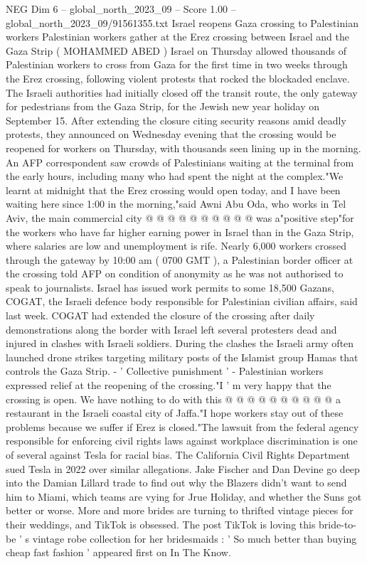 \begin{textsample}{NEG Dim 6 – global\_north\_2023\_09 – Score 1.00 – global\_north\_2023\_09/91561355.txt}  \label{ex:f6_neg_340}
Israel reopens Gaza crossing to Palestinian workers Palestinian workers gather at the Erez crossing between Israel and the Gaza Strip ( MOHAMMED ABED ) Israel on Thursday allowed thousands of Palestinian workers to cross from Gaza for the first time in two weeks through the Erez crossing, following violent protests that rocked the blockaded enclave.
The Israeli authorities had initially closed off the transit route, the only gateway for pedestrians from the Gaza Strip, for the Jewish new year holiday on September 15.
After extending the closure citing security reasons amid deadly protests, they announced on Wednesday evening that the crossing would be reopened for workers on Thursday, with thousands seen lining up in the morning.
An AFP correspondent saw crowds of Palestinians waiting at the terminal from the early hours, including many who had spent the night at the complex."We learnt at midnight that the Erez crossing would open today, and I have been waiting here since 1:00 in the morning,"said Awni Abu Oda, who works in Tel Aviv, the main commercial city @ @ @ @ @ @ @ @ @ @ was a"positive step"for the workers who have far higher earning power in Israel than in the Gaza Strip, where salaries are low and unemployment is rife.
Nearly 6,000 workers crossed through the gateway by 10:00 am ( 0700 GMT ), a Palestinian border officer at the crossing told AFP on condition of anonymity as he was not authorised to speak to journalists.
Israel has issued work permits to some 18,500 Gazans, COGAT, the Israeli defence body responsible for Palestinian civilian affairs, said last week.
COGAT had extended the closure of the crossing after daily demonstrations along the border with Israel left several protesters dead and injured in clashes with Israeli soldiers.
During the clashes the Israeli army often launched drone strikes targeting military posts of the Islamist group Hamas that controls the Gaza Strip. - ' Collective punishment ' - Palestinian workers expressed relief at the reopening of the crossing."I ' m very happy that the crossing is open.
We have nothing to do with this @ @ @ @ @ @ @ @ @ @ a restaurant in the Israeli coastal city of Jaffa."I hope workers stay out of these problems because we suffer if Erez is closed."The lawsuit from the federal agency responsible for enforcing civil rights laws against workplace discrimination is one of several against Tesla for racial bias.
The California Civil Rights Department sued Tesla in 2022 over similar allegations.
Jake Fischer and Dan Devine go deep into the Damian Lillard trade to find out why the Blazers didn't want to send him to Miami, which teams are vying for Jrue Holiday, and whether the Suns got better or worse.
More and more brides are turning to thrifted vintage pieces for their weddings, and TikTok is obsessed.
The post TikTok is loving this bride-to-be ' s vintage robe collection for her bridesmaids : ' So much better than buying cheap fast fashion ' appeared first on In The Know.

\end{textsample}
